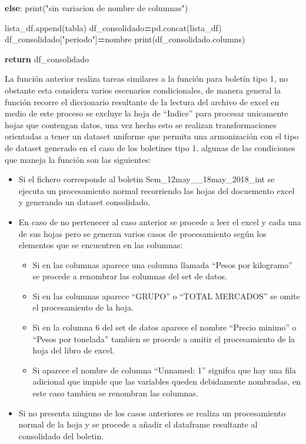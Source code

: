 \documentclass[
]{book}
\newenvironment{Shaded}{\begin{snugshade}}{\end{snugshade}}
\newcommand{\BuiltInTok}[1]{#1}
\newcommand{\ControlFlowTok}[1]{\textcolor[rgb]{0.13,0.29,0.53}{\textbf{#1}}}
\newcommand{\NormalTok}[1]{#1}
\newcommand{\OperatorTok}[1]{\textcolor[rgb]{0.81,0.36,0.00}{\textbf{#1}}}
\newcommand{\StringTok}[1]{\textcolor[rgb]{0.31,0.60,0.02}{#1}}
\begin{document}
\begin{Shaded}
\begin{Highlighting}[]
                    
            \ControlFlowTok{else}\NormalTok{:}
                \BuiltInTok{print}\NormalTok{(}\StringTok{"sin variacion de nombre de columnas"}\NormalTok{)}
                      
\NormalTok{                lista\_df.append(tabla)}
\NormalTok{                df\_consolidado}\OperatorTok{=}\NormalTok{pd.concat(lista\_df)}
\NormalTok{                df\_consolidado[}\StringTok{"periodo"}\NormalTok{]}\OperatorTok{=}\NormalTok{nombre}
                \BuiltInTok{print}\NormalTok{(df\_consolidado.columns)}
            
    \ControlFlowTok{return}\NormalTok{ df\_consolidado}
\end{Highlighting}
\end{Shaded}

La función anterior realiza tareas similares a la función para boletín tipo 1, no obstante esta considera varios escenarios condicionales, de manera general la función recorre el diccionario resultante de la lectura del archivo de excel en medio de este proceso se excluye la hoja de ``Indice'' para procesar unicamente hojas que contengan datos, una vez hecho esto se realizan transformaciones orientadas a tener un dataset uniforme que permita una armonización con el tipo de dataset generado en el caso de los boletines tipo 1, algunas de las condiciones que maneja la función son las siguientes:

\begin{itemize}
\item
  Si el fichero corresponde al boletin Sem\_12may\_\_18may\_2018\_int se ejecuta un procesamiento normal recorriendo las hojas del docuemento excel y generando un dataset consolidado.
\item
  En caso de no pertenecer al caso anterior se procede a leer el excel y cada una de sus hojas pero se generan varios casos de procesamiento según los elementos que se encuentren en las columnas:

  \begin{itemize}
  \item
    Si en las columnas aparece una columna llamada ``Pesos por kilogramo'' se procede a renombrar las columnas del set de datos.
  \item
    Si en las columnas aparece ``GRUPO'' o ``TOTAL MERCADOS'' se omite el procesamiento de la hoja.
  \item
    Si en la columna 6 del set de datos aparece el nombre ``Precio minimo'' o ``Pesos por tonelada'' tambien se procede a omitir el procesamiento de la hoja del libro de excel.\\
  \item
    Si aparece el nombre de columna ``Unnamed: 1'' signifca que hay una fila adicional que impide que las variables queden debidamente nombradas, en este caso tambien se renombran las columnas.
  \end{itemize}
\item
  Si no presenta ninguno de los casos anteriores se realiza un procesamiento normal de la hoja y se procede a añadir el dataframe resultante al consolidado del boletin.
\end{itemize}
\end{document}
